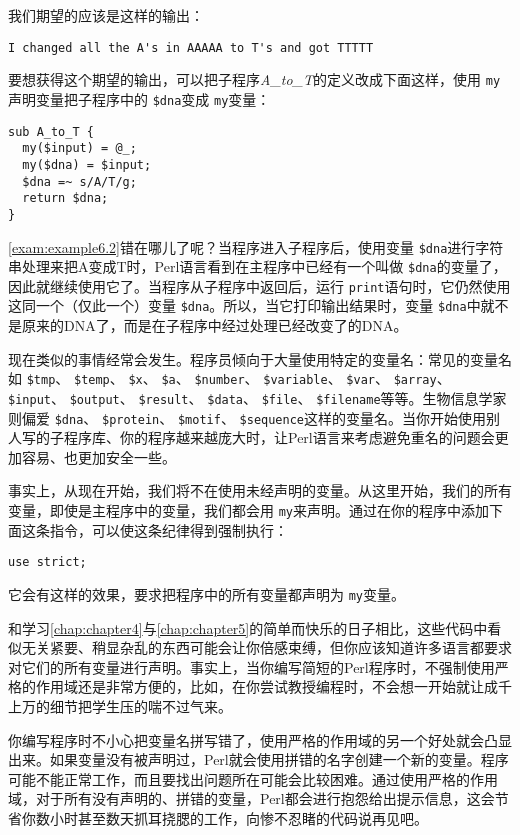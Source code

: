 我们期望的应该是这样的输出：

\begin{lstlisting}
I changed all the A's in AAAAA to T's and got TTTTT 
\end{lstlisting}

要想获得这个期望的输出，可以把子程序\textit{A\_to\_T}的定义改成下面这样，使用 \verb|my|声明变量把子程序中的 \verb|$dna|变成 \verb|my|变量：

\begin{lstlisting}
sub A_to_T {
  my($input) = @_;
  my($dna) = $input;
  $dna =~ s/A/T/g;
  return $dna;
}
\end{lstlisting}

\autoref{exam:example6.2}错在哪儿了呢？当程序进入子程序后，使用变量 \verb|$dna|进行字符串处理来把A变成T时，Perl语言看到在主程序中已经有一个叫做 \verb|$dna|的变量了，因此就继续使用它了。当程序从子程序中返回后，运行 \verb|print|语句时，它仍然使用这同一个（仅此一个）变量 \verb|$dna|。所以，当它打印输出结果时，变量 \verb|$dna|中就不是原来的DNA了，而是在子程序中经过处理已经改变了的DNA。

现在类似的事情经常会发生。程序员倾向于大量使用特定的变量名：常见的变量名如 \verb|$tmp|、 \verb|$temp|、 \verb|$x|、 \verb|$a|、 \verb|$number|、 \verb|$variable|、 \verb|$var|、 \verb|$array|、 \verb|$input|、 \verb|$output|、 \verb|$result|、 \verb|$data|、 \verb|$file|、 \verb|$filename|等等。生物信息学家则偏爱 \verb|$dna|、 \verb|$protein|、 \verb|$motif|、 \verb|$sequence|这样的变量名。当你开始使用别人写的子程序库、你的程序越来越庞大时，让Perl语言来考虑避免重名的问题会更加容易、也更加安全一些。

事实上，从现在开始，我们将不在使用未经声明的变量。从这里开始，我们的所有变量，即使是主程序中的变量，我们都会用 \verb|my|来声明。通过在你的程序中添加下面这条指令，可以使这条纪律得到强制执行：

\begin{lstlisting}
use strict;
\end{lstlisting}

它会有这样的效果，要求把程序中的所有变量都声明为 \verb|my|变量。

和学习\autoref{chap:chapter4}与\autoref{chap:chapter5}的简单而快乐的日子相比，这些代码中看似无关紧要、稍显杂乱的东西可能会让你倍感束缚，但你应该知道许多语言都要求对它们的所有变量进行声明。事实上，当你编写简短的Perl程序时，不强制使用严格的作用域还是非常方便的，比如，在你尝试教授编程时，不会想一开始就让成千上万的细节把学生压的喘不过气来。

你编写程序时不小心把变量名拼写错了，使用严格的作用域的另一个好处就会凸显出来。如果变量没有被声明过，Perl就会使用拼错的名字创建一个新的变量。程序可能不能正常工作，而且要找出问题所在可能会比较困难。通过使用严格的作用域，对于所有没有声明的、拼错的变量，Perl都会进行抱怨给出提示信息，这会节省你数小时甚至数天抓耳挠腮的工作，向惨不忍睹的代码说再见吧。

